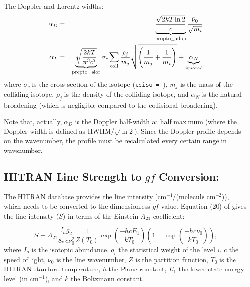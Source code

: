 \documentclass[letterpaper,12pt]{article}
\begin{document}
The Doppler and Lorentz widths:
\begin{eqnarray}
\label{eq:doppler}
 \alpha_D &=& \underbrace{\frac{\sqrt{2k T \ln{2}}}{c}}_{\rm{propto\_adop}}
              \frac{\bar\nu_0}{\sqrt{m_i}} \label{dopbr} \\
\label{eq:lorentz}
 \alpha_L &=& \underbrace{\sqrt{\frac{2k T}{\pi^3c^2}}}_{\rm{propto\_alor}}
              \sigma_c\sum_{\rm coll}\frac{\rho_j}{m_j}
              \sqrt{\left(\frac{1}{m_j} + \frac{1}{m_i}\right)}
              + \underbrace{\alpha_{N}}_{\mathrm{ignored}}
\end{eqnarray}
where $\sigma_c$ is the cross section of the isotope (\texttt{csiso =
}), $m_j$ is the mass of the colliding
isotope, $\rho_j$ is the density of the colliding isotope, and
$\alpha_N$ is the natural broadening (which is negligible compared to
the collisional broadening).

Note that, actually, $\alpha_D$ is the Doppler half-width at half
maximum (where the Doppler width is defined as HWHM/$\sqrt{\ln 2}$).
Since the Doppler profile depends on the wavenumber, the profile must
be recalculated every certain range in wavenumber. \newline

\subsection{HITRAN Line Strength to $gf$ Conversion:}

The HITRAN database \citep{Rothman2013JqsrtHITRAN} provides the line
intensity (cm$^{-1}$/(molecule cm$^{-2}$)), which needs to be
converted to the dimensionless $gf$ value.  Equation (20) of
\citet{Simeckova2006JqsrtHITRAN} gives the line intensity ($S$) in
terms of the Einstein $A_{21}$ coefficient:

\begin{equation}
S = A_{21} \frac{I_a g_2}{8\pi c \nu_0^2}
           \frac{1}{Z(T_0)}
           \exp\left(\frac{-hcE_1}{kT_0}\right)
           \left(1-\exp\left(\frac{-hc\nu_0}{kT_0}\right)\right),
\end{equation}
where $I_a$ is the isotopic abundance, $g_i$ the statistical weight of
the level $i$, $c$ the speed of light, $\nu_0$ is the line wavenumber,
$Z$ is the partition function, $T_0$ is the HITRAN standard
temperature, $h$ the Planc constant, $E_1$ the lower state energy
level (in cm$^{-1}$), and $k$ the Boltzmann constant.
\end{document}
